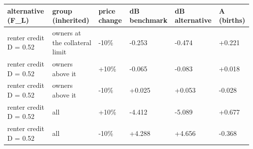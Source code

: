 \begingroup\small
\setlength{\tabcolsep}{3pt}
\renewcommand{\arraystretch}{1.04}
\begin{tabularx}{\linewidth}{XXXXXX}
\toprule
alternative (F\_L) & group (inherited) & price change & dB benchmark & dB alternative & A (births) \\
\midrule
renter credit D = 0.52 & owners at the collateral limit & -10\% & -0.253 & -0.474 & +0.221 \\
renter credit D = 0.52 & owners above it & +10\% & -0.065 & -0.083 & +0.018 \\
renter credit D = 0.52 & owners above it & -10\% & +0.025 & +0.053 & -0.028 \\
renter credit D = 0.52 & all & +10\% & -4.412 & -5.089 & +0.677 \\
renter credit D = 0.52 & all & -10\% & +4.288 & +4.656 & -0.368 \\
\bottomrule
\end{tabularx}
\endgroup
